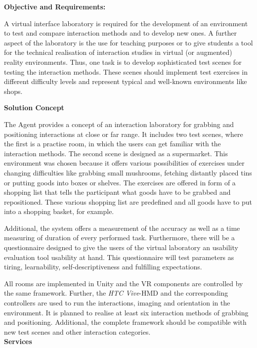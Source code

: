 \documentclass[a4paper, 12pt]{article}
\begin{document}
\textbf{Objective and Requirements:}

A virtual interface laboratory is required for the development of an environment to test and compare interaction methods and to develop new ones. A further aspect of the laboratory is the use for teaching purposes or to give students a tool for the technical realisation of interaction studies in virtual (or augmented) reality environments. Thus, one task is to develop sophisticated test scenes for testing the interaction methods. These scenes should implement test exercises in different difficulty levels and represent typical and well-known environments like shops. %

\textbf{Solution Concept}
 
  The Agent provides a concept of an interaction laboratory for grabbing and positioning interactions at close or far range. It includes two test scenes, where the first is a practise room, in which the users can get familiar with the interaction methods. The second scene is designed as a supermarket. This environment was chosen because it offers various possibilities of exercises under changing difficulties like grabbing small mushrooms, fetching distantly placed tins or putting goods into boxes or shelves. The exercises are offered in form of a shopping list that tells the participant what goods have to be grabbed and repositioned. These various shopping list are predefined and all goods have to put into a shopping basket, for example. 
  
  Additional, the system offers a measurement of the accuracy as well as a time measuring of duration of every performed task. Furthermore, there will be a questionnaire designed to give the users of the virtual laboratory an usability evaluation tool usability at hand. This questionnaire will test parameters as tiring, learnability, self-descriptiveness and fulfilling expectations.
 
 All rooms are implemented in Unity and the VR components are controlled by the same framework. Further, the \textit{HTC Vive}-HMD and the corresponding controllers are used to run the interactions, imaging and orientation in the environment. It is planned to realise at least six interaction methods of grabbing and positioning. Additional, the complete framework should be compatible with new test scenes and other interaction categories. \\

 
\textbf{Services}
\end{document}
